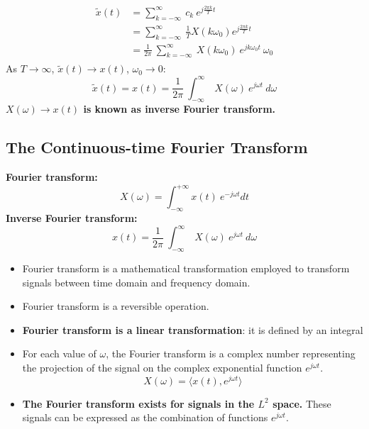 \documentclass[12pt,a4paper]{article}
\begin{document}
\begin{tcolorbox}[breakable]
 \begin{align*}\begin{split}
 \tilde{x}(t) &=\sum_{k=-\infty}^{\infty} \ c_{k} \ e^{j\frac{2\pi k}{T}t}\\
 &=\sum_{k=-\infty}^{\infty}  \ \frac{1}{T} X(k\omega_{0}) e^{j\frac{2\pi k}{T}t}\\
 &= \frac{1}{2 \pi} \ \sum_{k=-\infty}^{\infty} \ X(k \omega_{0}) \ e^{j k \omega_{0} t} \ \omega_{0} 
 \end{split}\end{align*}
As $T \to \infty$, $\tilde{x}(t) \to x(t)$, $\omega_{0} \to 0$:
\begin{equation}
\tilde{x}(t) = x(t) = \frac{1}{2 \pi} \ \int_{-\infty}^{\infty} \ X( \omega) \ e^{j \omega t} \ d\omega 
\end{equation}
 \textbf{$X(\omega) \to x(t)$ is known as inverse Fourier transform.}
\end{tcolorbox}

\subsection{The Continuous-time Fourier Transform}
\textbf{Fourier transform:}
\[ X(\omega) =  \int_{-\infty}^{+\infty} x(t) \ e^{-j \omega t} dt \]
\textbf{Inverse Fourier transform:}
\[ x(t) = \frac{1}{2 \pi} \ \int_{-\infty}^{\infty} \ X( \omega) \ e^{j \omega t} \ d\omega \]


\begin{itemize}
\item Fourier transform is a mathematical transformation employed to transform signals between time domain and frequency domain.
\item Fourier transform is a reversible operation.
\item \textbf{Fourier transform is a linear transformation}: it is defined by an integral
\item For each value of $\omega$, the Fourier transform is a complex number representing the projection of the signal on the complex exponential function $e^{j \omega t }$.
\[ X(\omega) = \langle x(t), e^{j \omega t} \rangle \]
\item \textbf{The Fourier transform exists for signals in the $L^{2}$ space.} These signals can be expressed as the combination of functions $e^{j \omega t}$.
\end{itemize}
\end{document}
